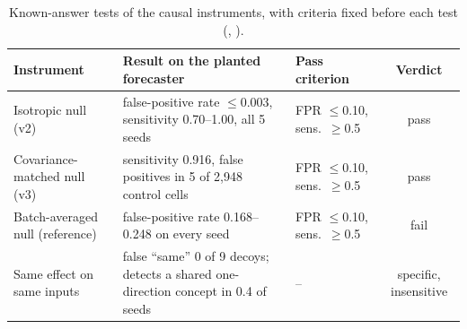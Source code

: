\begin{table}[!tb]
\centering
\footnotesize
\setlength{\tabcolsep}{4pt}
\begin{tabularx}{\textwidth}{@{}>{\raggedright}p{4.4cm}>{\raggedright}X>{\raggedright}p{3.0cm}c@{}}
\toprule
Instrument & Result on the planted forecaster & Pass criterion & Verdict \\
\midrule
Isotropic null (v2) & false-positive rate $\le$0.003, sensitivity 0.70--1.00, all 5 seeds & FPR $\le$0.10, sens.\ $\ge$0.5 & pass \\
Covariance-matched null (v3) & sensitivity 0.916, false positives in 5 of 2{,}948 control cells & FPR $\le$0.10, sens.\ $\ge$0.5 & pass \\
Batch-averaged null (reference) & false-positive rate 0.168--0.248 on every seed & FPR $\le$0.10, sens.\ $\ge$0.5 & fail \\
Same effect on same inputs & false ``same'' 0 of 9 decoys; detects a shared one-direction concept in 0.4 of seeds & -- & specific, insensitive \\
\bottomrule
\end{tabularx}
\caption{Known-answer tests of the causal instruments, with criteria fixed before each test (,
).}
\label{tab:knownanswer}
\end{table}
